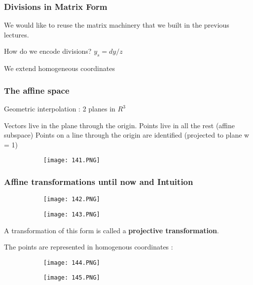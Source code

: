 \documentclass{article}
\begin{document}
\subsubsection{Divisions in Matrix Form}

We would like to reuse the matrix machinery that we built in the previous lectures.

How do we encode divisions? $y_s = dy/z$

We extend homogeneous coordinates


\vspace{40mm}

\subsubsection{The affine space}

Geometric interpolation : 2 planes in $R^3$

Vectors live in the plane through the origin.
Points live in all the rest (affine subspace)
Points on a line through the origin are identified (projected to plane w = 1)


\begin{figure}[ht!]
  \centering
  \begin{subfigure}[b]{0.2\linewidth}
    \texttt{[image: 141.PNG]}
  \end{subfigure}
\end{figure}

\subsubsection{Affine transformations until now and Intuition}

\begin{figure}[ht!]
  \centering
  \begin{subfigure}[b]{0.29\linewidth}
    \texttt{[image: 142.PNG]}
  \end{subfigure}
  \begin{subfigure}[b]{0.7\textwidth}
         \centering
         \texttt{[image: 143.PNG]}
     \end{subfigure}
\end{figure}

A transformation of this form is called a \textbf{projective transformation}.

The points are represented in homogenous coordinates : 


\begin{figure}[ht!]
  \centering
  \begin{subfigure}[b]{0.49\linewidth}
    \texttt{[image: 144.PNG]}
  \end{subfigure}
  \begin{subfigure}[b]{0.3\textwidth}
         \centering
         \texttt{[image: 145.PNG]}
     \end{subfigure}
\end{figure}
\end{document}
